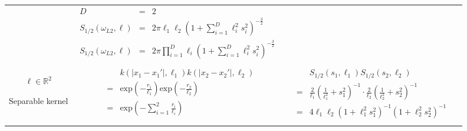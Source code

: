 \documentclass[]{interact}
\theoremstyle{plain}%
\theoremstyle{definition}
\theoremstyle{remark}
\begin{document}
\begin{landscape}
\begin{table}[H]
\begin{center}
\begin{tabular}{|c|c|c|c|}
       & \multicolumn{1}{|p{8.2cm}|}{\small
         \begin{eqnarray*}
		D &=& 2\\
		S_{1/2}(\omega_{L2},\bm{\ell}) &=& 2\pi\ell_1\ell_2 \left( 1+ \sum_{i=1}^{D}\ell_i^2 s_i^2 \right)^{-\frac{3}{2}}\\
		S_{1/2}(\omega_{L2},\bm{\ell}) &=& 2\pi\prod_{i=1}^{D}\ell_i \left( 1+ \sum_{i=1}^{D}\ell_i^2 s_i^2 \right)^{-\frac{3}{2}}
         \end{eqnarray*}
        }
        
       & \multicolumn{1}{|p{6.2cm}|}{\small

       } \\  
       \vspace{-8mm}\\
       \cline{1-3}
       
       \multicolumn{1}{|p{1.5cm}|}{
       \vspace{1mm}
       $\bm{\ell} \in \mathbb{R}^2$
       
       {Separable kernel} 
       }
       
        & \multicolumn{1}{|p{7.2cm}|}{\small
         \begin{eqnarray*}
		&&k(|x_1-x_1'|,\ell_1)k(|x_2-x_2'|,\ell_2) \\
		&=& \mathrm{exp}\left(- \frac{r_1}{\ell_1} \right) \mathrm{exp}\left(- \frac{r_2}{\ell_2} \right) \\
		&=& \mathrm{exp}\left(- \sum_{i=1}^{2}\frac{r_i}{\ell_i} \right)
         \end{eqnarray*}
       }
       
       & \multicolumn{1}{|p{8.2cm}|}{\small
         \begin{eqnarray*}
         &&S_{1/2}(s_1,\ell_1)S_{1/2}(s_2,\ell_2) \\
		&=& \frac{2}{\ell_1}\left(\frac{1}{\ell_1^2}+s_1^2 \right)^{-1} \cdot \frac{2}{\ell_2}\left(\frac{1}{\ell_2^2}+s_2^2 \right)^{-1} \\
		&=& 4\ell_1\ell_2\left(1+\ell_1^2s_1^2 \right)^{-1} \left(1+\ell_2^2s_2^2 \right)^{-1} \\
         \end{eqnarray*}        
       } 

       & \multicolumn{1}{|p{6.2cm}|}{\small

       } \\ 
       
       \hline
    \end{tabular}
  \end{center}
\end{table}



\end{landscape}
\end{document}
